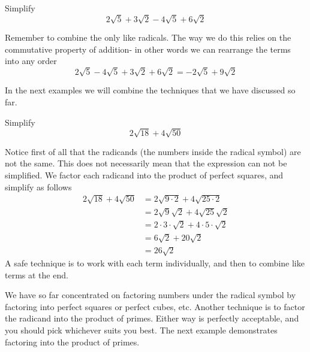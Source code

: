 \begin{myexample}
Simplify
\[
	2\sqrt{5}+3\sqrt{2}-4\sqrt{5}+6\sqrt{2}
\]
\end{myexample}
\begin{myProof}
	Remember to combine the only like radicals. The way we do this relies on the commutative
	property of addition- in other words we can rearrange the terms into any order
	\[
		2\sqrt{5} - 4\sqrt{5}+3\sqrt{2}+6\sqrt{2} = -2\sqrt{5}+9\sqrt{2}
	\]
	{}
\end{myProof} 
In the next examples we will combine the techniques that we have discussed so far.

\begin{myexample}
Simplify 
\[
	2\sqrt{18}+ 4\sqrt{50}
\]
\end{myexample}
\begin{myProof}
	Notice first of all that the radicands (the numbers inside the radical symbol) are not the same. This
	does not necessarily mean that the expression can not be simplified. We factor each radicand into
	the product of perfect squares, and simplify as follows
	\begin{align*}
		2\sqrt{18}+ 4\sqrt{50} & =  2\sqrt{9\cdot 2}+ 4 \sqrt{25\cdot 2}             \\
		                       & =  2\sqrt{9}\sqrt{2}+4\sqrt{25}\sqrt{2}             \\
		                       & =  2\cdot 3 \cdot \sqrt{2} + 4\cdot 5\cdot \sqrt{2} \\
		                       & =  6\sqrt{2} + 20 \sqrt{2}                          \\
		                       & =  26\sqrt{2}                                       
	\end{align*} 
	A safe technique is to work with each term individually, and then to combine like terms at the end.
\end{myProof} 
We have so far concentrated on factoring numbers under the radical symbol by factoring into perfect
squares or perfect cubes, etc. Another technique is to factor the radicand into the product of primes. 
Either way is perfectly acceptable, and you should pick whichever suits you best. The next example demonstrates
factoring into the product of primes. 

